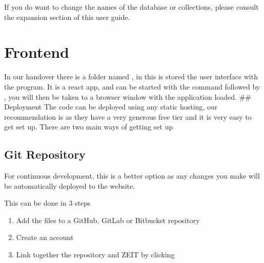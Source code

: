 \documentclass[letterpaper,10pt,english]{sphinxmanual}
\begin{document}
If you do want to change the names of the database or collections,
please consult the expansion section of this user guide.


\section{Frontend}
\label{\detokenize{docs/Installation/frontEnd:frontend}}\label{\detokenize{docs/Installation/frontEnd::doc}}
In our handover there is a folder named , in this is stored
the user interface with the program. It is a react app, and can be
started with the command  followed by , you
will then be taken to a browser window with the application loaded. \#\#
Deployment The code can be deployed using any static hosting, our
recommendation is  as they have a very
generous free tier and it is very easy to get set up. There are two main
ways of getting set up


\subsection{Git Repository}
\label{\detokenize{docs/Installation/frontEnd:git-repository}}

For continuous development, this is a better option as any changes you
make will be automatically deployed to the website.

This can be done in 3 steps
\begin{enumerate}
%
\item {} 
Add the files to a GitHub, GitLab or Bitbucket repository

\item {} 
Create an account 

\item {} 
Link together the repository and ZEIT by clicking 

\end{enumerate}
\end{document}
